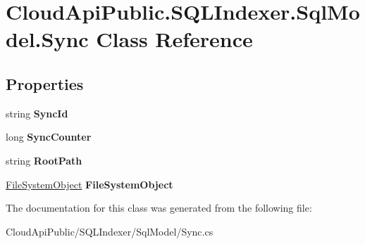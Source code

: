 \hypertarget{class_cloud_api_public_1_1_s_q_l_indexer_1_1_sql_model_1_1_sync}{\section{Cloud\-Api\-Public.\-S\-Q\-L\-Indexer.\-Sql\-Model.\-Sync Class Reference}
\label{class_cloud_api_public_1_1_s_q_l_indexer_1_1_sql_model_1_1_sync}
}
\subsection*{Properties}
\begin{DoxyCompactItemize}
\item 
\hypertarget{class_cloud_api_public_1_1_s_q_l_indexer_1_1_sql_model_1_1_sync_ab7c6eb65342bc3e8cf38ca5611d86ffd}{string {\bfseries Sync\-Id}}\label{class_cloud_api_public_1_1_s_q_l_indexer_1_1_sql_model_1_1_sync_ab7c6eb65342bc3e8cf38ca5611d86ffd}

\item 
\hypertarget{class_cloud_api_public_1_1_s_q_l_indexer_1_1_sql_model_1_1_sync_a7d4474f2f5698a0b122de88a96633615}{long {\bfseries Sync\-Counter}}\label{class_cloud_api_public_1_1_s_q_l_indexer_1_1_sql_model_1_1_sync_a7d4474f2f5698a0b122de88a96633615}

\item 
\hypertarget{class_cloud_api_public_1_1_s_q_l_indexer_1_1_sql_model_1_1_sync_a6f4ea6fcd4bc3fe1624bfbc5a37696b6}{string {\bfseries Root\-Path}}\label{class_cloud_api_public_1_1_s_q_l_indexer_1_1_sql_model_1_1_sync_a6f4ea6fcd4bc3fe1624bfbc5a37696b6}

\item 
\hypertarget{class_cloud_api_public_1_1_s_q_l_indexer_1_1_sql_model_1_1_sync_aa5d19110182f3366840d92ca15262213}{\hyperlink{class_cloud_api_public_1_1_s_q_l_indexer_1_1_sql_model_1_1_file_system_object}{File\-System\-Object} {\bfseries File\-System\-Object}}\label{class_cloud_api_public_1_1_s_q_l_indexer_1_1_sql_model_1_1_sync_aa5d19110182f3366840d92ca15262213}

\end{DoxyCompactItemize}


The documentation for this class was generated from the following file\-:\begin{DoxyCompactItemize}
\item 
Cloud\-Api\-Public/\-S\-Q\-L\-Indexer/\-Sql\-Model/Sync.\-cs\end{DoxyCompactItemize}
